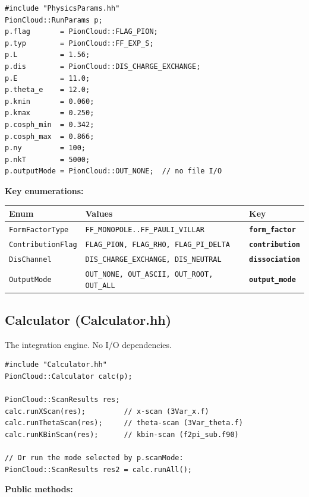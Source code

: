 \documentclass[11pt,a4paper]{article}
\newcommand{\code}[1]{\texttt{#1}}
\newcommand{\inikey}[1]{\texttt{\textbf{#1}}}
\begin{document}
\begin{lstlisting}[style=cppstyle]
#include "PhysicsParams.hh"
PionCloud::RunParams p;
p.flag       = PionCloud::FLAG_PION;
p.typ        = PionCloud::FF_EXP_S;
p.L          = 1.56;
p.dis        = PionCloud::DIS_CHARGE_EXCHANGE;
p.E          = 11.0;
p.theta_e    = 12.0;
p.kmin       = 0.060;
p.kmax       = 0.250;
p.cosph_min  = 0.342;
p.cosph_max  = 0.866;
p.ny         = 100;
p.nkT        = 5000;
p.outputMode = PionCloud::OUT_NONE;  // no file I/O
\end{lstlisting}

\textbf{Key enumerations:}

\begin{center}
\begin{tabular}{lll}
\toprule
\textbf{Enum} & \textbf{Values} & \textbf{Key} \\
\midrule
\code{FormFactorType}  & \code{FF\_MONOPOLE..FF\_PAULI\_VILLAR} & \inikey{form\_factor} \\
\code{ContributionFlag} & \code{FLAG\_PION, FLAG\_RHO, FLAG\_PI\_DELTA} & \inikey{contribution} \\
\code{DisChannel}      & \code{DIS\_CHARGE\_EXCHANGE, DIS\_NEUTRAL} & \inikey{dissociation} \\
\code{OutputMode}      & \code{OUT\_NONE, OUT\_ASCII, OUT\_ROOT, OUT\_ALL} & \inikey{output\_mode} \\
\bottomrule
\end{tabular}
\end{center}

\subsection{Calculator (Calculator.hh)}

The integration engine.  No I/O dependencies.

\begin{lstlisting}[style=cppstyle]
#include "Calculator.hh"
PionCloud::Calculator calc(p);

PionCloud::ScanResults res;
calc.runXScan(res);         // x-scan (3Var_x.f)
calc.runThetaScan(res);     // theta-scan (3Var_theta.f)
calc.runKBinScan(res);      // kbin-scan (f2pi_sub.f90)

// Or run the mode selected by p.scanMode:
PionCloud::ScanResults res2 = calc.runAll();
\end{lstlisting}

\textbf{Public methods:}
\end{document}
